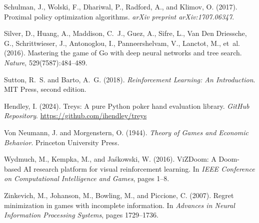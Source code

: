 \documentclass[11pt,a4paper]{article}
\begin{document}
\begin{thebibliography}{99}
Schulman, J., Wolski, F., Dhariwal, P., Radford, A., and Klimov, O. (2017).
\newblock Proximal policy optimization algorithms.
\newblock \emph{arXiv preprint arXiv:1707.06347}.

Silver, D., Huang, A., Maddison, C.~J., Guez, A., Sifre, L., Van Den Driessche, G., Schrittwieser, J., Antonoglou, I., Panneershelvam, V., Lanctot, M., et~al. (2016).
\newblock Mastering the game of Go with deep neural networks and tree search.
\newblock \emph{Nature}, 529(7587):484--489.

Sutton, R.~S. and Barto, A.~G. (2018).
\newblock \emph{Reinforcement Learning: An Introduction}.
\newblock MIT Press, second edition.

Hendley, I. (2024).
\newblock Treys: A pure Python poker hand evaluation library.
\newblock \emph{GitHub Repository}. \url{https://github.com/ihendley/treys}

Von Neumann, J. and Morgenstern, O. (1944).
\newblock \emph{Theory of Games and Economic Behavior}.
\newblock Princeton University Press.

Wydmuch, M., Kempka, M., and Jaśkowski, W. (2016).
\newblock ViZDoom: A Doom-based AI research platform for visual reinforcement learning.
\newblock In \emph{IEEE Conference on Computational Intelligence and Games}, pages 1--8.

Zinkevich, M., Johanson, M., Bowling, M., and Piccione, C. (2007).
\newblock Regret minimization in games with incomplete information.
\newblock In \emph{Advances in Neural Information Processing Systems}, pages 1729--1736.

\end{thebibliography}
\end{document}
